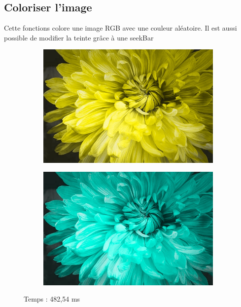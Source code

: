 \documentclass{article}
\begin{document}
\bigbreak

\subsection{Coloriser l'image}
\medbreak

Cette fonctions colore une image RGB avec une couleur aléatoire. Il est aussi possible de modifier la teinte grâce à une seekBar
\medbreak

\begin{figure}[h!]
    \centering
    \begin{subfigure}[b]{0.4\linewidth}
        \includegraphics[width=\linewidth]{./Images/Multicolor/Random_1.jpg}
    \end{subfigure}
    \begin{subfigure}[b]{0.4\linewidth}
        \includegraphics[width=\linewidth]{./Images/Multicolor/Random_2.jpg}
    \end{subfigure}
    \bigbreak
    Temps : 482,54 ms
\end{figure}
\end{document}
